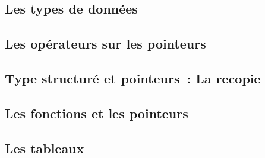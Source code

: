 \subsection*{Les types de données}









\subsection*{Les opérateurs sur les pointeurs}















\subsection*{Type structuré et pointeurs~: La recopie}







\subsection*{Les fonctions et les pointeurs}













\subsection*{Les tableaux}







